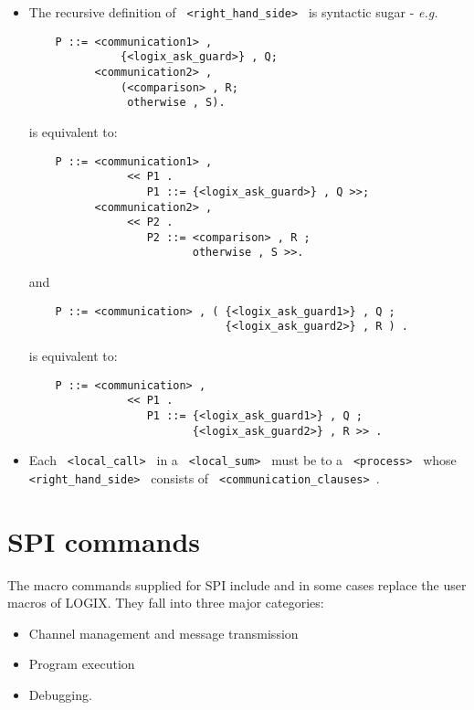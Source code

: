 \begin{itemize}
\item
The recursive definition of \verb+ <right_hand_side> + is syntactic
sugar - {\em e.g.}

\begin{verbatim}
    P ::= <communication1> ,
              {<logix_ask_guard>} , Q;
          <communication2> ,
              (<comparison> , R;
               otherwise , S).
\end{verbatim}

\noindent
is equivalent to:

\begin{verbatim}
    P ::= <communication1> ,
               << P1 .
                  P1 ::= {<logix_ask_guard>} , Q >>;
          <communication2> ,
               << P2 .
                  P2 ::= <comparison> , R ;
                         otherwise , S >>.
\end{verbatim}

\noindent
and

\begin{verbatim}
    P ::= <communication> , ( {<logix_ask_guard1>} , Q ;
                              {<logix_ask_guard2>} , R ) .
\end{verbatim}

\noindent
is equivalent to:

\begin{verbatim}
    P ::= <communication> , 
               << P1 .
                  P1 ::= {<logix_ask_guard1>} , Q ;
                         {<logix_ask_guard2>} , R >> .
\end{verbatim}


\item
Each \verb+ <local_call> + in a \verb+ <local_sum> + must be to a 
\verb+ <process> + whose \verb+ <right_hand_side> + consists of
\verb+ <communication_clauses> +.

\end{itemize}

\chapter{SPI commands}
\label{commands}

The macro commands supplied for SPI include and in some cases replace
the user macros of LOGIX.  They fall into three major
categories:

\begin{itemize}
\item Channel management and message transmission
\item Program execution
\item Debugging.
\end{itemize}

